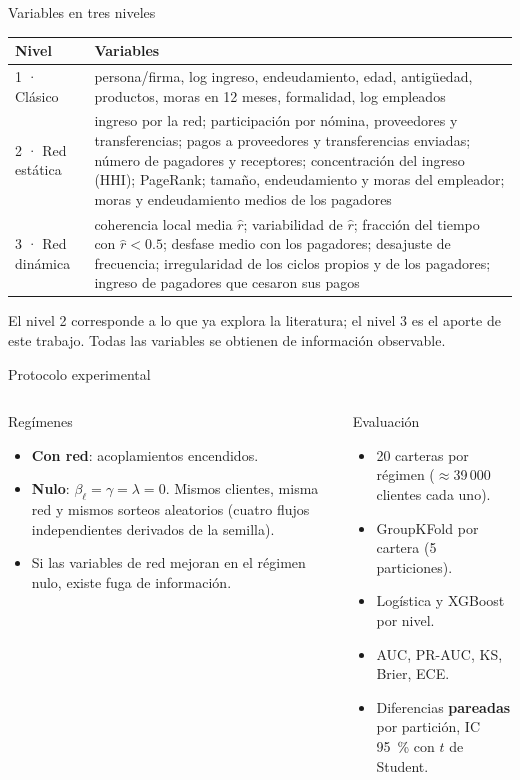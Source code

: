 \documentclass[aspectratio=169,10pt]{beamer}
\begin{document}
\begin{frame}{Variables en tres niveles}
\footnotesize
\begin{tabular}{p{}p{}}
\toprule
Nivel & Variables \\
\midrule
1 · Clásico & persona/firma, log ingreso, endeudamiento, edad, antigüedad, productos,
moras en 12 meses, formalidad, log empleados \\
2 · Red estática & ingreso por la red; participación por nómina, proveedores y
transferencias; pagos a proveedores y transferencias enviadas; número de pagadores y
receptores; concentración del ingreso (HHI); PageRank; tamaño, endeudamiento y moras del
empleador; moras y endeudamiento medios de los pagadores \\
3 · Red dinámica & coherencia local media $\hat r$; variabilidad de $\hat r$; fracción
del tiempo con $\hat r<0.5$; desfase medio con los pagadores; desajuste de frecuencia;
irregularidad de los ciclos propios y de los pagadores; ingreso de pagadores que
cesaron sus pagos \\
\bottomrule
\end{tabular}
\vspace{0.3cm}

\small El nivel 2 corresponde a lo que ya explora la literatura; el nivel 3 es el aporte
de este trabajo. Todas las variables se obtienen de información observable.
\end{frame}

\begin{frame}{Protocolo experimental}
\begin{columns}[T]
\begin{block}{Regímenes}
\begin{itemize}
\item \textbf{Con red}: acoplamientos encendidos.
\item \textbf{Nulo}: $\beta_\ell=\gamma=\lambda=0$. Mismos clientes, misma red y mismos
sorteos aleatorios (cuatro flujos independientes derivados de la semilla).
\item Si las variables de red mejoran en el régimen nulo, existe fuga de información.
\end{itemize}
\end{block}
\begin{block}{Evaluación}
\begin{itemize}
\item 20 carteras por régimen ($\approx$39\,000 clientes cada uno).
\item GroupKFold por cartera (5 particiones).
\item Logística y XGBoost por nivel.
\item AUC, PR-AUC, KS, Brier, ECE.
\item Diferencias \textbf{pareadas} por partición, IC 95~\% con $t$ de Student.
\end{itemize}
\end{block}
\end{columns}
\end{frame}
\end{document}
